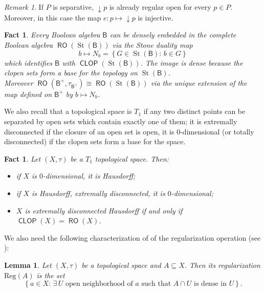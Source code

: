 \documentclass[11pt]{amsart}
\theoremstyle{plain}
\newtheorem{lemma}[theorem]{Lemma}
\newtheorem{fact}[theorem]{Fact}
\theoremstyle{definition}
\theoremstyle{plain}
\theoremstyle{remark}
\newtheorem{remark}[theorem]{Remark}
\DeclareMathOperator{\St}{St}
\DeclareMathOperator{\RO}{\mathsf{RO}}
\DeclareMathOperator{\CLOP}{\mathsf{CLOP}}
\newcommand{\bool}[1]{\mathsf{#1}}
\newcommand{\Reg}[1]{\mathrm{Reg}\left(#1\right)}
\newcommand{\bp}[1]{\left\lbrace #1 \right\rbrace}
\newcommand{\0}{\mathsf{0}}
\renewcommand{\1}{\mathsf{1}}
\renewcommand{\2}{\mathsf{2}}
\theoremstyle{definition}
\begin{document}
\begin{remark}
If $P$ is separative, $\downarrow p$ is already regular open for every $p\in P$. Moreover, in this case the map $e:p\mapsto\downarrow p$ is injective.
\end{remark}
\begin{fact}
\label{alg:com}
Every Boolean algebra $\bool{B}$
can be densely embedded in the complete Boolean algebra
$\RO(\St(\bool{B}))$
via the Stone duality map
\[
b\mapsto N_b=\bp{G\in\St(\bool{B}):\, b\in G}
\]
which identifies $\bool{B}$ with $\CLOP(\St(\bool{B}))$.
The image is dense because the clopen sets form a base for the topology on
$\St(\bool{B})$. \\
Moreover $\RO(\bool{B}^+,\tau_{\bool{B}^+})\cong\RO(\St(\bool{B}))$
via the unique extension of the map defined on 
$\bool{B}^+$ by $b\mapsto N_b$. 
\end{fact}






We also recall that a topological space is $T_1$ if any two distinct points can be separated by open sets which contain exactly one of them; it is extremally disconnected if the closure of an open set is open, it is
$0$-dimensional (or totally disconnected) if the clopen sets form a base for the space.

\begin{fact}
Let $(X, \tau)$ be a $T_1$ topological space. Then:
\begin{itemize}
\item if $X$ is $0$-dimensional, it is Hausdorff;
\item if $X$ is Hausdorff, extremally disconnected, it is $0$-dimensional;
\item $X$ is extremally disconnected Hausdorff if and only if $\CLOP(X)=\RO(X)$.
\end{itemize}
\end{fact}


We also need the following characterization of  of the regularization operation (see \cite[Lemma 2.1.4]{viale-bookonforcing}):
\begin{lemma}\label{lem:charreg}
Let $(X,\tau)$ be a topological space and $A\subseteq X$. Then its regularization $\Reg{A}$ is the set
\[
\bp{a\in X: \, \exists\, U\text{ open neighborhood of }a \text{ such that }A\cap U\text{ is dense in }U}.
\]
\end{lemma}
\end{document}

